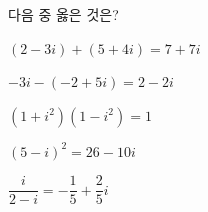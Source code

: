 다음 중 옳은 것은?
\begin{choicesv}{\rule[-3ex]{0pt}{8ex}$(2-3i)+(5+4i)=7+7i$}{\rule[-3ex]{0pt}{8ex}$-3i-(-2+5i)=2-2i$}{\rule[-3ex]{0pt}{8ex}$(1+i^2)(1-i^2)=1$}{\rule[-3ex]{0pt}{8ex}$(5-i)^2=26-10i$}{\rule[-3ex]{0pt}{8ex}$\dfrac{i}{2-i}=-\dfrac{1}{5}+\dfrac{2}{5}i$}\end{choicesv}
